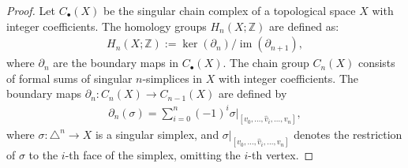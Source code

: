 \begin{proof}
Let $C_{\bullet}(X)$ be the singular chain complex of a topological space $X$ with integer coefficients. The homology groups $H_{n}(X; \mathbb{Z})$ are defined as:
\begin{align}
H_{n}(X; \mathbb{Z}) := \ker(\partial_{n}) / \operatorname{im}(\partial_{n+1}),
\end{align}
where $\partial_{n}$ are the boundary maps in $C_{\bullet}(X)$. The chain group $C_{n}(X)$ consists of formal sums of singular $n$-simplices in $X$ with integer coefficients. The boundary maps $\partial_{n}: C_{n}(X) \rightarrow C_{n-1}(X)$ are defined by
\begin{align}
\partial_{n}(\sigma) = \sum_{i=0}^{n}(-1)^{i} \sigma|_{[v_0, \ldots, \hat{v}_i, \ldots, v_n]},
\end{align}
where $\sigma: \triangle^{n} \rightarrow X$ is a singular simplex, and $\sigma|_{[v_0, \ldots, \hat{v}_i, \ldots, v_n]}$ denotes the restriction of $\sigma$ to the $i$-th face of the simplex, omitting the $i$-th vertex.


\end{proof}
